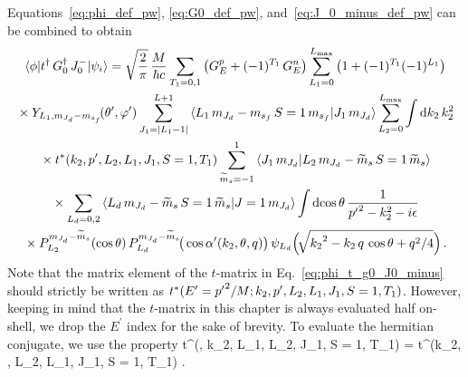 	Equations~\eqref{eq:phi_def_pw}, \eqref{eq:G0_def_pw},
	and~\eqref{eq:J_0_minus_def_pw} can be combined to obtain
	\begin{multline}
	 \mbraket{\phi}{t^\dag \, \GreensFn^\dag \, J_0^-}{\psi_i}
	 = \sqrt{\frac{2}{\pi}} \,\frac{M}{\hbar c}
	 \sum_{T_1 = 0,1} \big(G_E ^p + (-1)^{T_1} \, G_E^n\big)
	 \sum_{L_1 = 0}^{L_{\rm max}} \big(1 + (-1)^{T_1} (-1)^{L_1}\big) \\
	 \null \times Y_{L_1 , \mJd - \msf}\!(\thetacm, \phicm)
	 \sum_{J_1 = |L_1 - 1|}^{L+1}
	 \CG{L_1}{\mJd - \msf}{S=1}{\msf}{J_1}{\mJd}
	 \sum_{L_2 = 0}^{L_{\rm max}} \int \dd k_2 \, k_2^2 \\
	 \null \times t^\ast(k_2, \pp, L_2, L_1, J_1, S = 1, T_1)
	 \sum_{\widetilde{m}_s = -1}^1
	 \braket{J_1 \, \mJd}{L_2 \, \mJd - \wt{m}_s \, S=1 \, \wt{m}_s} \\
	 \null \times \sum_{L_d = 0,2}
	 \CG{L_d}{\mJd - \widetilde{m}_s}{S = 1}{\widetilde{m}_s}{J = 1}{\mJd}
	 \int \dcostheta
	 \, \frac{1}{{\pp}^2 - k_2^2 - i \epsilon} \\
	 \null \times
	 P_{L_2}^{\mJd - \widetilde{m}_s}(\cos\theta) \,
	 P_{L_d}^{\mJd - \widetilde{m}_s}\!\big(\cos\thetacprime(k_2, \theta, q)\big)
	 \, \psi_{L_d}\Big(\!\sqrt{{k_2}^2 - k_2 \, q \, \cos\theta + q^2/4}\Big) \,.
	\label{eq:phi_t_g0_J0_minus}
	\end{multline}
	Note that the matrix element of the $t$-matrix in
	Eq.~\eqref{eq:phi_t_g0_J0_minus} should strictly be written as
	${t^{\ast}}({E^\prime} = {p^\prime}^2/M; k_2, p^\prime, L_2, L_1, J_1, S=1, T_1)$.  However,
	keeping in mind that the $t$-matrix in this chapter is always evaluated
	half on-shell, we drop the $E^\prime$ index for the sake of brevity.
	To evaluate the hermitian conjugate, we use the property
	\beq
	t^\dag (\pp, k_2, L_1, L_2, J_1, S = 1, T_1)
	= t^\ast (k_2, \pp, L_2, L_1, J_1, S = 1, T_1) \;.
	\eeq

